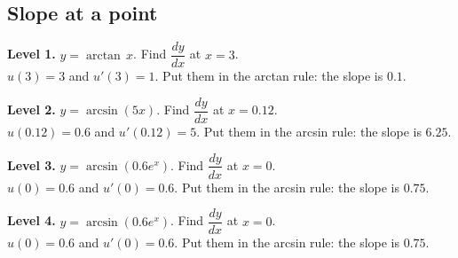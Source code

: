 \documentclass[11pt]{article}
\begin{document}
\subsection*{Slope at a point}
\noindent\textbf{Level 1.} $y=\arctan\,x$. Find $\dfrac{dy}{dx}$ at $x=3$.\\  \quad $u(3)=3$ and $u'(3)=1$. Put them in the arctan rule: the slope is $0.1$.\par\medskip
\noindent\textbf{Level 2.} $y=\arcsin\left(5x\right)$. Find $\dfrac{dy}{dx}$ at $x=0.12$.\\  \quad $u(0.12)=0.6$ and $u'(0.12)=5$. Put them in the arcsin rule: the slope is $6.25$.\par\medskip
\noindent\textbf{Level 3.} $y=\arcsin\left(0.6e^{x}\right)$. Find $\dfrac{dy}{dx}$ at $x=0$.\\  \quad $u(0)=0.6$ and $u'(0)=0.6$. Put them in the arcsin rule: the slope is $0.75$.\par\medskip
\noindent\textbf{Level 4.} $y=\arcsin\left(0.6e^{x}\right)$. Find $\dfrac{dy}{dx}$ at $x=0$.\\  \quad $u(0)=0.6$ and $u'(0)=0.6$. Put them in the arcsin rule: the slope is $0.75$.\par\medskip
\end{document}
